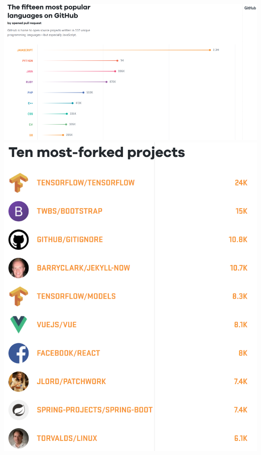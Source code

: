 \documentclass[11pt]{article}
\makeatletter
\def\maxwidth{\ifdim\Gin@nat@width>\linewidth\linewidth
    \else\Gin@nat@width\fi}
\let\Oldincludegraphics\includegraphics
\renewcommand{\includegraphics}[1]{\Oldincludegraphics[width=.8\maxwidth]{#1}}
\makeatother
\begin{document}
\includegraphics{./img/top_github.png} \includegraphics{./img/top_1.png}
\end{document}
